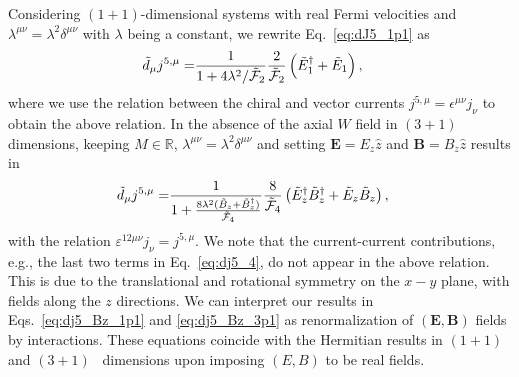 \documentclass[prl,aps,showpacs,twocolumn,preprintnumbers,
amsmath,amssymb,superscriptaddress,longbibliography]{revtex4-1}
\newcommand{\bolds}[1]{\boldsymbol #1}
\begin{document}
Considering $(1+1)$-dimensional systems with real Fermi velocities and $\lambda^{\mu \nu}=\lambda^{2} \delta^{\mu \nu}$ with $\lambda$ being a constant, we rewrite Eq.~\eqref{eq:dJ5_1p1} as
\begin{align}
\tilde{d}_{\mu} j^{5,\mu}  =
& \frac{   1}{1  + 4 \lambda^2/\tilde{\cal F}_{2} } \frac{   2}{\tilde{\cal F}_{2}}
     \left(   \tilde{E}_{1}^{\dagger} + \tilde{E}_{1}
\right)
\label{eq:dj5_Bz_1p1}
,
\end{align}
where we use the relation between the chiral and vector currents $j^{5,\mu} = \epsilon^{\mu \nu} j_{\nu}$ to obtain the above relation. In the absence of the axial $W$ field in $(3+1)$ dimensions, keeping $M \in \mathbb{R}$, $\lambda^{\mu \nu}=\lambda^{2} \delta^{\mu \nu}$ and setting $\bolds{E} = E_{z} \hat{z} $ and $\bolds{B} = B_{z} \hat{z} $ results in
\begin{align}
   \tilde{d}_{\mu} j^{5,\mu}  =
& \frac{   1}{1  + \frac{8 \lambda^2 (\tilde{B}_{z} + \tilde{B}^{\dagger}_{z})}{\tilde{\cal F}_{4} } } \frac{   8}{\tilde{\cal F}_{4} }
     \left(   \tilde{E}_{z}^{\dagger} \tilde{B}_{z}^{\dagger} 
     +
     \tilde{E}_{z} \tilde{B}_{z}
\right)
\label{eq:dj5_Bz_3p1}
,
\end{align}
with the relation $\varepsilon^{12 \mu \nu } j_{\nu}=j^{5,\mu}$. We note that the current-current contributions, e.g., the last two terms in Eq.~\eqref{eq:dj5_4}, do not appear in the above relation. This is due to the translational and rotational symmetry on the $x-y$ plane, with fields along the $z$ directions. 
We can interpret our results in Eqs.~\eqref{eq:dj5_Bz_1p1} and \eqref{eq:dj5_Bz_3p1} as renormalization of $(\bolds{E},\bolds{B})$ fields by interactions. These equations coincide with the Hermitian results in $(1+1)$~\cite{Shei1972, Parhizkar2023} and $(3+1)$~\cite{Rylands2021, Parhizkar2023} dimensions upon imposing $(E, B)$ to be real fields.
\end{document}
